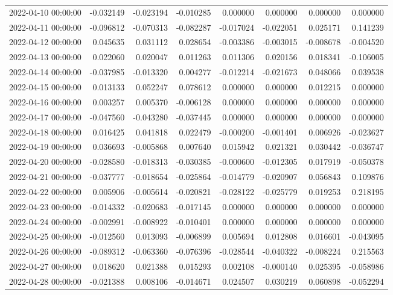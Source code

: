 \begin{tabular}{lrrrrrrr}
2022-04-10 00:00:00 & -0.032149 & -0.023194 & -0.010285 & 0.000000 & 0.000000 & 0.000000 & 0.000000 \\
2022-04-11 00:00:00 & -0.096812 & -0.070313 & -0.082287 & -0.017024 & -0.022051 & 0.025171 & 0.141239 \\
2022-04-12 00:00:00 & 0.045635 & 0.031112 & 0.028654 & -0.003386 & -0.003015 & -0.008678 & -0.004520 \\
2022-04-13 00:00:00 & 0.022060 & 0.020047 & 0.011263 & 0.011306 & 0.020156 & 0.018341 & -0.106005 \\
2022-04-14 00:00:00 & -0.037985 & -0.013320 & 0.004277 & -0.012214 & -0.021673 & 0.048066 & 0.039538 \\
2022-04-15 00:00:00 & 0.013133 & 0.052247 & 0.078612 & 0.000000 & 0.000000 & 0.012215 & 0.000000 \\
2022-04-16 00:00:00 & 0.003257 & 0.005370 & -0.006128 & 0.000000 & 0.000000 & 0.000000 & 0.000000 \\
2022-04-17 00:00:00 & -0.047560 & -0.043280 & -0.037445 & 0.000000 & 0.000000 & 0.000000 & 0.000000 \\
2022-04-18 00:00:00 & 0.016425 & 0.041818 & 0.022479 & -0.000200 & -0.001401 & 0.006926 & -0.023627 \\
2022-04-19 00:00:00 & 0.036693 & -0.005868 & 0.007640 & 0.015942 & 0.021321 & 0.030442 & -0.036747 \\
2022-04-20 00:00:00 & -0.028580 & -0.018313 & -0.030385 & -0.000600 & -0.012305 & 0.017919 & -0.050378 \\
2022-04-21 00:00:00 & -0.037777 & -0.018654 & -0.025864 & -0.014779 & -0.020907 & 0.056843 & 0.109876 \\
2022-04-22 00:00:00 & 0.005906 & -0.005614 & -0.020821 & -0.028122 & -0.025779 & 0.019253 & 0.218195 \\
2022-04-23 00:00:00 & -0.014332 & -0.020683 & -0.017145 & 0.000000 & 0.000000 & 0.000000 & 0.000000 \\
2022-04-24 00:00:00 & -0.002991 & -0.008922 & -0.010401 & 0.000000 & 0.000000 & 0.000000 & 0.000000 \\
2022-04-25 00:00:00 & -0.012560 & 0.013093 & -0.006899 & 0.005694 & 0.012808 & 0.016601 & -0.043095 \\
2022-04-26 00:00:00 & -0.089312 & -0.063360 & -0.076396 & -0.028544 & -0.040322 & -0.008224 & 0.215563 \\
2022-04-27 00:00:00 & 0.018620 & 0.021388 & 0.015293 & 0.002108 & -0.000140 & 0.025395 & -0.058986 \\
2022-04-28 00:00:00 & -0.021388 & 0.008106 & -0.014671 & 0.024507 & 0.030219 & 0.060898 & -0.052294 \\

\end{tabular}
